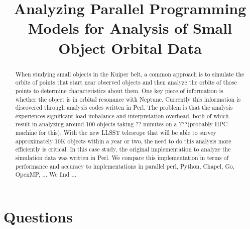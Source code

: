 \documentclass[conference]{IEEEtran}
\begin{document}
\title{Analyzing Parallel Programming Models for Analysis of Small Object Orbital Data}


\author{
\and
{}
}

\maketitle

\begin{abstract}
When studying small objects in the Kuiper belt, a common approach is to simulate the orbits
of points that start near observed objects and then analyze the orbits of those points to determine
characteristics about them.  One key piece of information is whether the object is in orbital resonance
with Neptune.  Currently this information is discovered through analysis codes written
in Perl.  The problem is that the analysis experiences significant load imbalance and interpretation
overhead, both of which result in analyzing around 100 objects taking ?? minutes
on a ???(probably HPC machine for this).  With the new LLSST telescope that will be able
to survey approximately 10K objects within a year or two, the need to do this analysis
more efficiently is critical.
In this case study, the original implementation to analyze the simulation data was
written in Perl.  We compare this implementation in terms of performance and accuracy
to implementations in parallel perl, Python, Chapel, Go, OpenMP, ...
We find ...
\end{abstract}

\IEEEpeerreviewmaketitle

\section{Questions}
\end{document}
